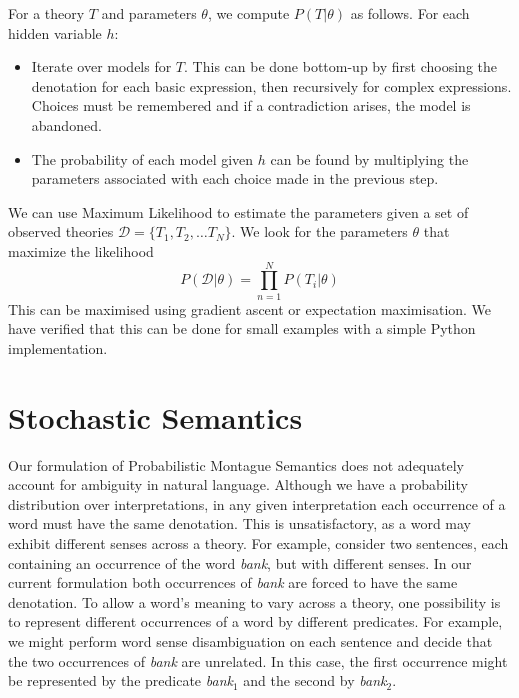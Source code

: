 \documentclass[manuscript]{clv2}
\begin{document}
For a theory $T$ and parameters $\theta$, we compute $P(T|\theta)$ as follows. For each hidden variable $h$:
\begin{itemize}
\item Iterate over models for $T$. This can be done bottom-up
  by first choosing the denotation for each basic expression,
  then recursively for complex expressions. Choices must be
  remembered and if a contradiction arises, the
  model is abandoned.
\item The probability of each model given $h$ can be found by
  multiplying the parameters associated with each choice made in the
  previous step.
\end{itemize}

We can use Maximum Likelihood to estimate the parameters given a set
of observed theories $\mathcal{D} = \{T_1, T_2, \ldots T_N\}$. We look
for the parameters $\theta$ that maximize the likelihood
$$P(\mathcal{D}|\theta) = \prod_{n=1}^N P(T_i|\theta)$$ This can be
maximised using gradient ascent or expectation maximisation. We have
verified that this can be done for small examples with a simple Python
implementation.

\section{Stochastic Semantics}

Our formulation of Probabilistic Montague Semantics
does not adequately account for ambiguity in natural language.
Although we have a probability distribution over
interpretations, 
in any given interpretation each occurrence of a
word must have the same denotation. This is unsatisfactory, as a
word may exhibit different senses across a
theory. For example, consider two sentences, each
containing  an occurrence of the word \emph{bank}, but with different senses. In our current
formulation both occurrences of \emph{bank} are forced to have the same denotation. To allow
a word's meaning 
to vary across a theory, one possibility
is to represent
different occurrences of a word by different
predicates. For example, we might perform word sense disambiguation on
each sentence and decide that the two occurrences of \emph{bank} are
unrelated. In this case, the first occurrence might be
represented by the predicate {\em bank}$_1$ and the second by {\em
  bank}$_2$.
\end{document}
